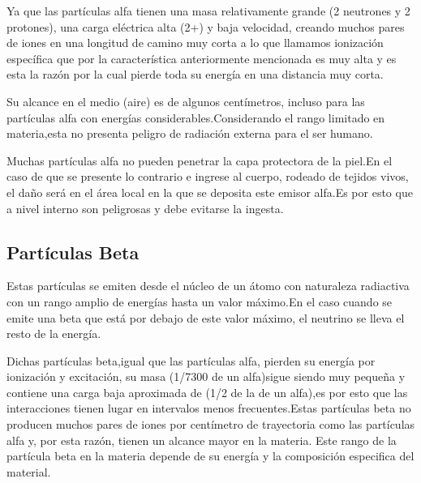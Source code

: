 \documentclass[12pt,fleqn]{book} %
\numberwithin{equation}{section} %
\numberwithin{figure}{section} %
\numberwithin{table}{section} %
\begin{document}
{Ya que las partículas alfa tienen una masa relativamente grande (2 neutrones y 2 protones), una carga eléctrica alta (2+) y baja velocidad, creando muchos pares de iones en una longitud de camino muy corta
a lo que llamamos ionización específica que por la característica anteriormente mencionada es muy alta y es esta la razón por la cual  pierde toda su energía en una distancia muy corta.

Su alcance en el medio (aire) es de algunos centímetros, incluso para las partículas alfa con energías  considerables.Considerando el rango limitado en materia,esta no presenta peligro de radiación externa para el ser humano.

Muchas partículas alfa no pueden penetrar la capa protectora de la piel.En el caso de que se presente lo contrario e ingrese al cuerpo, rodeado de tejidos vivos, el daño será en el área local en la que se deposita este emisor alfa.Es por esto que a nivel interno son peligrosas y debe evitarse la ingesta. 
 

\subsection{ Partículas Beta}
Estas partículas se emiten desde el núcleo de un átomo con naturaleza radiactiva
con un rango amplio de energías hasta un valor máximo.En el caso cuando se emite una beta que está por debajo de este valor máximo, el neutrino se lleva el resto de la energía.

Dichas partículas beta,igual que las partículas alfa, pierden su energía por ionización y excitación, su masa (1/7300 de un alfa)sigue siendo muy pequeña y contiene una carga baja aproximada de (1/2 de la de un alfa),es por esto que las interacciones tienen lugar en intervalos menos frecuentes.Estas partículas beta no producen muchos pares de iones por centímetro de trayectoria como las partículas alfa y, por esta razón, tienen un alcance mayor en la materia. Este rango de la partícula beta en la materia depende de su energía y la composición especifica del material.

}
\end{document}
